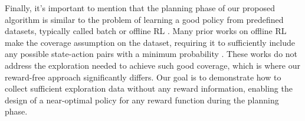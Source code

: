 Finally, it's important to mention that the planning phase of our proposed algorithm is similar to the problem of learning a good policy from predefined datasets, typically called batch or offline RL \citep{levine2020offline}. Many prior works on offline RL make the coverage assumption on the dataset, requiring it to sufficiently include any possible state-action pairs with a minimum probability \citep{precup2000eligibility,antos2008learning,chen2019information,munos2008finite}. These works do not address the exploration needed to achieve such good coverage, which is where our reward-free approach significantly differs. Our goal is to demonstrate how to collect sufficient exploration data without any reward information, enabling the design of a near-optimal policy for any reward function during the planning phase.
%